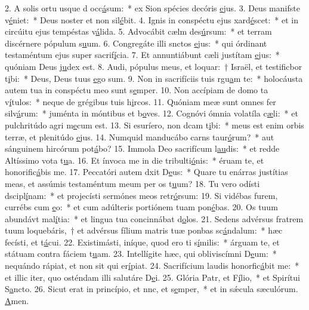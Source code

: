 2. A solis ortu usque d occ\uline{á}sum:~* ex Sion spécies decóris \uline{e}jus.
3. Deus manifste v\uline{é}niet:~* Deus noster et non sil\uline{é}bit.
4. Ignis in conspéctu ejus xard\uline{é}scet:~* et in circúitu ejus tempéstas v\uline{á}lida.
5. Advocábit cælm des\uline{ú}rsum:~* et terram discérnere pópulum s\uline{u}um.
6. Congregáte illi snctos \uline{e}jus:~* qui órdinant testaméntum ejus super sacrif\uline{í}cia.
7. Et annuntiábunt cæli justítam \uline{e}jus:~* quóniam Deus j\uline{u}dex est.
8. Audi, pópulus meus, et loquar:~† Israël, et testificbor t\uline{i}bi:~* Deus, Deus tuus \uline{e}go sum.
9. Non in sacrifíciis tuis rgu\uline{a}m te:~* holocáusta autem tua in conspéctu meo sunt s\uline{e}mper.
10. Non accípiam de domo ta v\uline{í}tulos:~* neque de grégibus tuis h\uline{i}rcos.
11. Quóniam meæ sunt omnes fer silv\uline{á}rum:~* juménta in móntibus et b\uline{o}ves.
12. Cognóvi ómnia volatíla c\uline{æ}li:~* et pulchritúdo agri m\uline{e}cum est.
13. Si esuríero, non dcam t\uline{i}bi:~* meus est enim orbis terræ, et plenitúdo \uline{e}jus.
14. Numquid manducábo carns taur\uline{ó}rum?~* aut sánguinem hircórum pot\uline{á}bo?
15. Immola Deo sacrifícum l\uline{au}dis:~* et redde Altíssimo vota t\uline{u}a.
16. Et ínvoca me in die tribulti\uline{ó}nis:~* éruam te, et honorific\uline{á}bis me.
17. Peccatóri autem dxit D\uline{e}us:~* Quare tu enárras justítias meas, et assúmis testaméntum meum per os t\uline{u}um?
18. Tu vero odísti dscipl\uline{í}nam:~* et projecísti sermónes meos retr\uline{ó}rsum:
19. Si vidébas furem, currébs cum \uline{e}o:~* et cum adúlteris portiónem tuam pon\uline{é}bas.
20. Os tuum abundávt mal\uline{í}tia:~* et lingua tua concinnábat d\uline{o}los.
21. Sedens advérsus fratrem tuum loquebáris,~† et advérsus fílium matris tuæ ponbas sc\uline{á}ndalum:~* hæc fecísti, et t\uline{á}cui.
22. Existimásti, iníque, quod ero ti s\uline{í}milis:~* árguam te, et státuam contra fáciem t\uline{u}am.
23. Intellígite hæc, qui obliviscímni D\uline{e}um:~* nequándo rápiat, et non sit qui er\uline{í}piat.
24. Sacrifícium laudis honorfic\uline{á}bit me:~* et illic iter, quo osténdam illi salutáre D\uline{e}i.
25. Glória Patr, et F\uline{í}lio,~* et Spirítui S\uline{a}ncto.
26. Sicut erat in princípio, et nnc, et s\uline{e}mper,~* et in sǽcula sæculórum. \uline{A}men.
